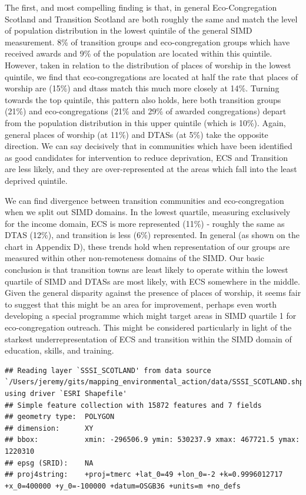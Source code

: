 \documentclass[11pt,]{article}
\begin{document}
The first, and most compelling finding is that, in general
Eco-Congregation Scotland and Transition Scotland are both roughly the
same and match the level of population distribution in the lowest
quintile of the general SIMD measurement. 8\% of transition groups and
eco-congregation groups which have received awards and 9\% of the
population are located within this quintile. However, taken in relation
to the distribution of places of worship in the lowest quintile, we find
that eco-congregations are located at half the rate that places of
worship are (15\%) and dtass match this much more closely at 14\%.
Turning towards the top quintile, this pattern also holds, here both
transition groups (21\%) and eco-congregations (21\% and 29\% of awarded
congregations) depart from the population distribution in this upper
quintile (which is 10\%). Again, general places of worship (at 11\%) and
DTASs (at 5\%) take the opposite direction. We can say decisively that
in communities which have been identified as good candidates for
intervention to reduce deprivation, ECS and Transition are less likely,
and they are over-represented at the areas which fall into the least
deprived quintile.

We can find divergence between transition communities and
eco-congregation when we split out SIMD domains. In the lowest quartile,
measuring exclusively for the income domain, ECS is more represented
(11\%) - roughly the same as DTAS (12\%), and transition is less (6\%)
represented. In general (as shown on the chart in Appendix D), these
trends hold when representation of our groups are measured within other
non-remoteness domains of the SIMD. Our basic conclusion is that
transition towns are least likely to operate within the lowest quartile
of SIMD and DTASs are most likely, with ECS somewhere in the middle.
Given the general disparity against the presence of places of worship,
it seems fair to suggest that this might be an area for improvement,
perhaps even worth developing a special programme which might target
areas in SIMD quartile 1 for eco-congregation outreach. This might be
considered particularly in light of the starkest underrepresentation of
ECS and transition within the SIMD domain of education, skills, and
training.

\begin{verbatim}
## Reading layer `SSSI_SCOTLAND' from data source `/Users/jeremy/gits/mapping_environmental_action/data/SSSI_SCOTLAND.shp' using driver `ESRI Shapefile'
## Simple feature collection with 15872 features and 7 fields
## geometry type:  POLYGON
## dimension:      XY
## bbox:           xmin: -296506.9 ymin: 530237.9 xmax: 467721.5 ymax: 1220310
## epsg (SRID):    NA
## proj4string:    +proj=tmerc +lat_0=49 +lon_0=-2 +k=0.9996012717 +x_0=400000 +y_0=-100000 +datum=OSGB36 +units=m +no_defs
\end{verbatim}
\end{document}
